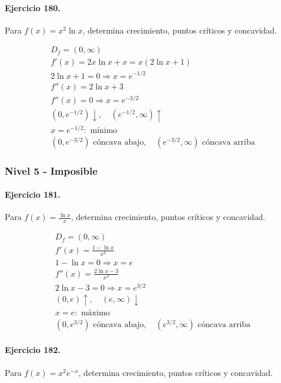 \documentclass[11pt,a4paper]{article}
\begin{document}
\paragraph{Ejercicio 180.} Para $f(x)=x^2\ln x$, determina crecimiento, puntos críticos y concavidad.

\[
\begin{aligned}
D_f=(0,\infty)\\
f'(x)=2x\ln x+x=x(2\ln x+1)\\
2\ln x+1=0\Rightarrow x=e^{-1/2}\\
f''(x)=2\ln x+3\\
f''(x)=0\Rightarrow x=e^{-3/2}\\
(0,e^{-1/2})\downarrow,\quad(e^{-1/2},\infty)\uparrow\\
x=e^{-1/2}:\text{{ mínimo}}\\
(0,e^{-3/2})\text{{ cóncava abajo}},\quad(e^{-3/2},\infty)\text{{ cóncava arriba}}
\end{aligned}
\]


\newpage

\subsubsection*{Nivel 5 - Imposible}

\paragraph{Ejercicio 181.} Para $f(x)=\frac{\ln x}{x}$, determina crecimiento, puntos críticos y concavidad.

\[
\begin{aligned}
D_f=(0,\infty)\\
f'(x)=\frac{1-\ln x}{x^2}\\
1-\ln x=0\Rightarrow x=e\\
f''(x)=\frac{2\ln x-3}{x^3}\\
2\ln x-3=0\Rightarrow x=e^{3/2}\\
(0,e)\uparrow,\quad(e,\infty)\downarrow\\
x=e:\text{{ máximo}}\\
(0,e^{3/2})\text{{ cóncava abajo}},\quad(e^{3/2},\infty)\text{{ cóncava arriba}}
\end{aligned}
\]


\paragraph{Ejercicio 182.} Para $f(x)=x^2e^{-x}$, determina crecimiento, puntos críticos y concavidad.
\end{document}
